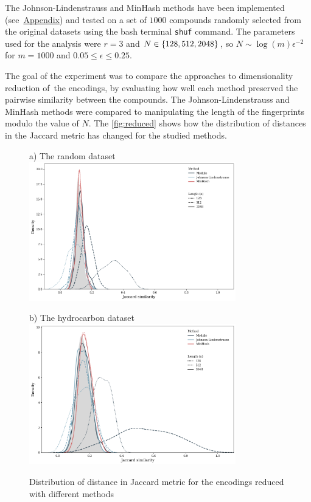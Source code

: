 The Johnson-Lindenstrauss and MinHash methods have been implemented (see~\hyperref[ch:appendix]{Appendix}) and tested on a set of \( 1000 \) compounds randomly selected from the original datasets using the bash terminal \texttt{shuf} command. The parameters used for the analysis were \( r = 3 \) and \( N \in \left\{ 128, 512, 2048 \right\} \), so \( N \sim \log(m)\epsilon^{-2} \) for \( m = 1000 \) and \( 0.05 \leq \epsilon \leq 0.25 \).

The goal of the experiment was to compare the approaches to dimensionality reduction of~the encodings, by evaluating how well each method preserved the pairwise similarity between the compounds. The Johnson-Lindenstrauss and MinHash methods were compared to manipulating the length of the fingerprints modulo the value of \( N \). The \autoref{fig:reduced} shows how the distribution of distances in the Jaccard metric has changed for the studied methods.
\begin{figure}[H]
    \centering
    a) The random dataset
    \includegraphics[width=0.8\textwidth]{figures/reduced.png}
\end{figure}
\begin{figure}[H]
    \centering
    b) The hydrocarbon dataset
    \includegraphics[width=0.8\textwidth]{figures/reduced_c22.png}
    \caption{Distribution of distance in Jaccard metric for the encodings reduced with different methods}
    \label{fig:reduced}
\end{figure}
